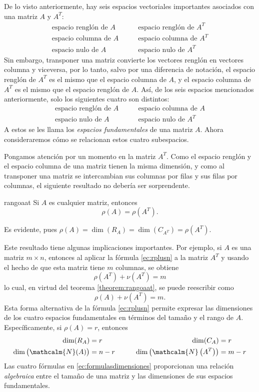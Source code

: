 De lo visto anteriormente, hay seis espacios vectoriales importantes asociados con una matriz $A$ y $A^T$:
$$\begin{array}{ll}
    \text{espacio renglón de } A & \qquad\text{espacio renglón de } A^T \\
    \text{espacio columna de } A & \qquad\text{espacio columna de } A^T \\
    \text{espacio nulo de } A & \qquad\text{espacio nulo de } A^T
\end{array}$$
Sin embargo, transponer una matriz convierte los vectores renglón en vectores columna y viceversa,  
por lo tanto, salvo por una diferencia de notación, el espacio renglón de $A^T$ es el mismo que el espacio columna de $A$, y el espacio columna de $A^T$ es el mismo que el espacio renglón de $A$. Así, de los seis espacios mencionados anteriormente, solo los siguientes cuatro son distintos:
$$\begin{array}{ll}
    \text{espacio renglón de } A & \qquad\text{espacio columna de } A \\
    \text{espacio nulo de } A & \qquad\text{espacio nulo de } A^T
\end{array}$$
A estos se les llama los \textit{espacios fundamentales} de una matriz $A$. Ahora consideraremos cómo se relacionan estos cuatro subespacios.

Pongamos atención por un momento en la matriz $A^T$. Como el espacio renglón y el espacio columna de una matriz tienen la misma dimensión, y como al transponer una matriz se intercambian sus columnas por filas y sus filas por columnas, el siguiente resultado no debería ser sorprendente.
\begin{theorem}{}{rangoaat}
    Si $A$ es cualquier matriz, entonces
    $$\rho(A) = \rho\left(A^T\right).$$

    \tcblower
    \demostracion Es evidente, pues $\rho(A) = \dim(R_A) = \dim(C_{A^T}) = \rho\left(A^T\right)$.
\end{theorem}

Este resultado tiene algunas implicaciones importantes. Por ejemplo, si $A$ es una matriz $m \times n$, entonces al aplicar la fórmula \eqref{ec:rplusn} a la matriz $A^T$ y usando el hecho de que esta matriz tiene $m$ columnas, se obtiene
$$\rho\left(A^T\right) + \nu\left(A^T\right) = m$$
lo cual, en virtud del teorema \ref{theorem:rangoaat}, se puede reescribir como
$$\rho(A) + \nu\left(A^T\right) = m.$$
Esta forma alternativa de la fórmula \eqref{ec:rplusn} permite expresar las dimensiones de los cuatro espacios fundamentales en términos del tamaño y el rango de $A$. Específicamente, si $\rho(A) = r$, entonces
\begin{equation}
    \begin{aligned}
        \dim(R_A) & = r & \dim(C_A) & = r \\
        \dim\big(\mathcalm{N}(A)\big) & = n - r & \qquad\dim\left(\mathcalm{N}\left(A^T\right)\right) & = m - r
    \end{aligned} \label{ec:formulasdimensiones}
\end{equation}
Las cuatro fórmulas en \eqref{ec:formulasdimensiones} proporcionan una relación \textit{algebraica} entre el tamaño de una matriz y las dimensiones de sus espacios fundamentales.

